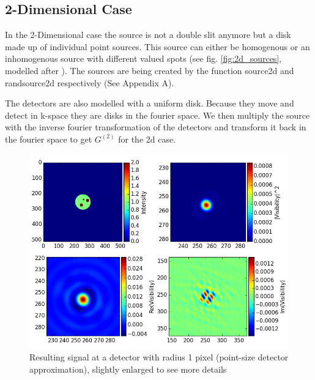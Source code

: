\documentclass{article}
\begin{document}
\subsection{2-Dimensional Case}
In the 2-Dimensional case the source is not a double slit anymore but a disk made up of individual point sources. This source can either be homogenous or an inhomogenous source with different valued spots (see fig. \ref{fig:2d_sources}, modelled after \cite{wentz2014}). The sources are being created by the function source2d and randsource2d respectively (See Appendix A).

The detectors are also modelled with a uniform disk. Because they move and detect in k-space they are disks in the fourier space. We then multiply the source with the inverse fourier transformation of the detectors and transform it back in the fourier space to get \(G^{(2)}\) for the 2d case. 


\begin{figure}[ht!]
	\centering
    \includegraphics[scale=0.5]{figure_results_ptsized}
    \caption{Resulting signal at a detector with radius 1 pixel (point-size detector approximation), slightly enlarged to see more details \label{fig:result_1px}
 }
\end{figure}
\end{document}

